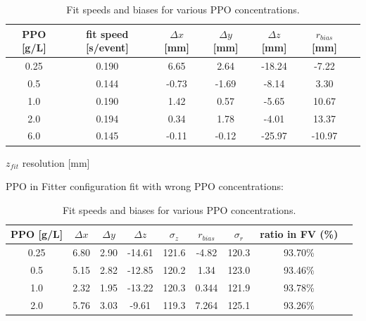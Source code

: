 \begin{table}[ht]
	\centering
	\caption{\label{partial_bias} Fit speeds and biases for various PPO concentrations.}	
	{\centering
		\begin{tabular*}{145         mm}{c@{\extracolsep{\fill}}cccccc}
			\toprule 
			PPO [g/L] & fit speed [s/event]& $\Delta x$ [mm]& $\Delta y$ [mm]& $\Delta z$ [mm] & $r_{bias}$ [mm] & \\
			\midrule
			0.25 & 0.190 &6.65 &2.64& -18.24& -7.22\\
			0.5  & 0.144 &-0.73 &-1.69& -8.14& 3.30 \\
			1.0 &0.190 & 1.42 &0.57 &-5.65& 10.67 \\
			2.0 &0.194 & 0.34 &1.78& -4.01& 13.37	\\
			6.0 &0.145 & -0.11& -0.12& -25.97& -10.97\\
			\bottomrule	
		\end{tabular*}
	}
\end{table}

$z_{fit}$ resolution [mm] 


PPO in Fitter configuration
fit with wrong PPO concentrations:  
\begin{table}[ht]
	\centering
	\caption{\label{partial_bias1} Fit speeds and biases for various PPO concentrations.}	
	{\centering
		\begin{tabular*}{140mm}{c@{\extracolsep{\fill}}cccccccc}
			\toprule 
			PPO [g/L] & $\Delta x$ & $\Delta y$ & $\Delta z$  & $\sigma_z$ & $r_{bias}$  & $\sigma_r$ & ratio in FV (\%)&\\
			\midrule
			0.25 & 6.80& 2.90& -14.61& 121.6& -4.82& 120.3& 93.70\%\\
			0.5  & 5.15& 2.82& -12.85 &120.2 &1.34 &123.0 &93.46\% \\
			1.0 &2.32 &1.95 &-13.22& 120.3& 0.344& 121.9 &93.78\% \\
			2.0 &5.76& 3.03& -9.61& 119.3& 7.264 &125.1& 93.26\% \\
			\bottomrule	
		\end{tabular*}
	}
\end{table}

